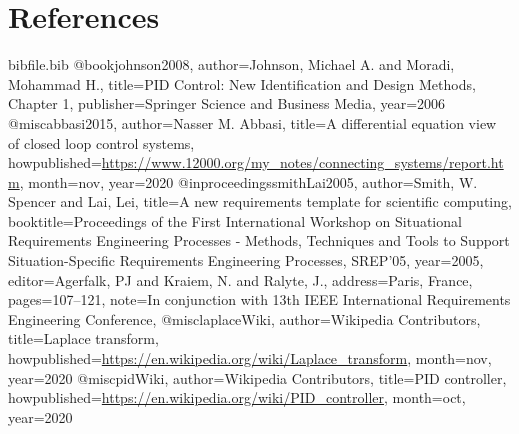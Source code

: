 \documentclass[12pt]{article}
\begin{document}
\section{References}
\label{Sec:References}
\begin{filecontents*}{bibfile.bib}
@book{johnson2008,
author={Johnson, Michael A. and Moradi, Mohammad H.},
title={PID Control: New Identification and Design Methods, Chapter 1},
publisher={Springer Science and Business Media},
year={2006}}
@misc{abbasi2015,
author={Nasser M. Abbasi},
title={A diﬀerential equation view of closed loop control systems},
howpublished={\url{https://www.12000.org/my\_notes/connecting\_systems/report.htm}},
month=nov,
year={2020}}
@inproceedings{smithLai2005,
author={Smith, W. Spencer and Lai, Lei},
title={A new requirements template for scientific computing},
booktitle={Proceedings of the First International Workshop on Situational Requirements Engineering Processes - Methods, Techniques and Tools to Support Situation-Specific Requirements Engineering Processes, SREP'05},
year={2005},
editor={Agerfalk, PJ and Kraiem, N. and Ralyte, J.},
address={Paris, France},
pages={107--121},
note={In conjunction with 13th IEEE International Requirements Engineering Conference,}}
@misc{laplaceWiki,
author={Wikipedia Contributors},
title={Laplace transform},
howpublished={\url{https://en.wikipedia.org/wiki/Laplace\_transform}},
month=nov,
year={2020}}
@misc{pidWiki,
author={Wikipedia Contributors},
title={PID controller},
howpublished={\url{https://en.wikipedia.org/wiki/PID\_controller}},
month=oct,
year={2020}}
\end{filecontents*}
\nocite{*}
\printbibliography[heading=none]
\end{document}
